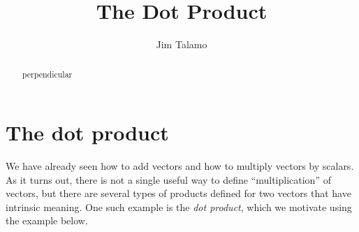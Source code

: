 \documentclass{ximera}
\author{Jim Talamo}
\title{The Dot Product}
\begin{document}
\begin{abstract}
perpendicular
\end{abstract}
\maketitle


\section{The dot product}

We have already seen how to add vectors and how to multiply vectors by
scalars.  As it turns out, there is not a single useful way to define ``multiplication'' of vectors, but there are several types of products defined for two vectors that have intrinsic meaning.  One such example is the \emph{dot product}, which we motivate using the example below.
\end{document}
